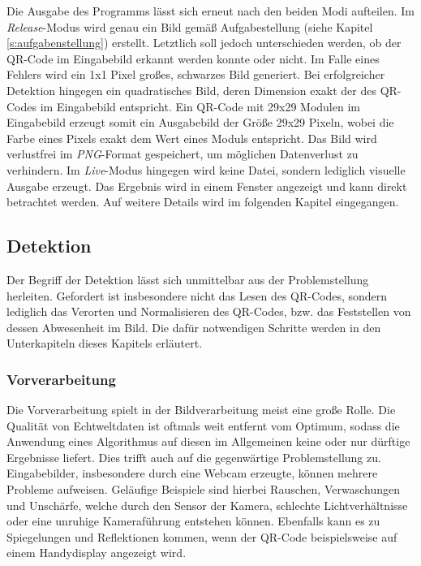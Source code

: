 \documentclass[a4paper, oneside, 12pt]{article}
\begin{document}
Die Ausgabe des Programms lässt sich erneut nach den beiden Modi aufteilen.
Im \emph{Release}-Modus wird genau ein Bild gemäß Aufgabestellung (siehe Kapitel \ref{s:aufgabenstellung}) erstellt. Letztlich soll jedoch unterschieden werden, ob der QR-Code im Eingabebild erkannt werden konnte oder nicht. Im Falle eines Fehlers wird ein 1x1 Pixel großes, schwarzes Bild generiert. Bei erfolgreicher Detektion hingegen ein quadratisches Bild, deren Dimension exakt der des QR-Codes im Eingabebild entspricht.
Ein QR-Code mit 29x29 Modulen im Eingabebild erzeugt somit ein Ausgabebild der Größe 29x29 Pixeln, wobei die Farbe eines Pixels exakt dem Wert eines Moduls entspricht.
Das Bild wird verlustfrei im \emph{PNG}-Format gespeichert, um möglichen Datenverlust zu verhindern.
Im \emph{Live}-Modus hingegen wird keine Datei, sondern lediglich visuelle Ausgabe erzeugt. Das Ergebnis wird in einem Fenster angezeigt und kann direkt betrachtet werden. Auf weitere Details wird im folgenden Kapitel eingegangen.

\subsection{Detektion}
\label{s:detektion}

Der Begriff der Detektion lässt sich unmittelbar aus der Problemstellung herleiten.
Gefordert ist insbesondere nicht das Lesen des QR-Codes, sondern lediglich das Verorten und Normalisieren des QR-Codes, bzw. das Feststellen von dessen Abwesenheit im Bild. Die dafür notwendigen Schritte werden in den Unterkapiteln dieses Kapitels erläutert.

\subsubsection{Vorverarbeitung}
Die Vorverarbeitung spielt in der Bildverarbeitung meist eine große Rolle. Die Qualität von Echtweltdaten ist oftmals weit entfernt vom Optimum, sodass die Anwendung eines Algorithmus auf diesen im Allgemeinen keine oder nur dürftige Ergebnisse liefert.
Dies trifft auch auf die gegenwärtige Problemstellung zu. Eingabebilder, insbesondere durch eine Webcam erzeugte, können mehrere Probleme aufweisen.
Geläufige Beispiele sind hierbei Rauschen, Verwaschungen und Unschärfe, welche durch den Sensor der Kamera, schlechte Lichtverhältnisse oder eine unruhige Kameraführung entstehen können. Ebenfalls kann es zu Spiegelungen und Reflektionen kommen, wenn  der QR-Code beispielsweise auf einem Handydisplay angezeigt wird.
\end{document}
